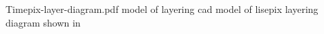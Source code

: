 \documentclass[../main.tex]{subfiles}%
\begin{document}
%
    \Xsupplement%
    \begin{supplement}%
        \supplementcaption%
            {Timepix-layer-diagram.pdf}%
            { model of  layering}%
            {\Gls{cad} model of \gls{lisepix} layering diagram shown in }%
        \label{sup:timepix-layer-diagram}%
    \end{supplement}%
\end{document}
